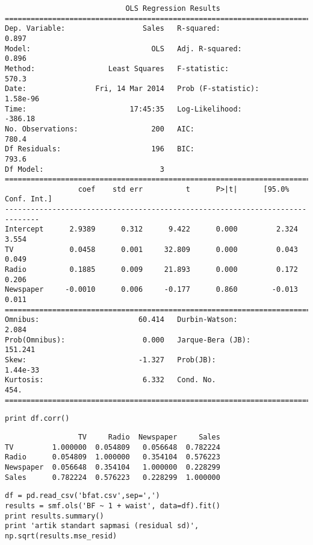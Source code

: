 \documentclass[12pt,fleqn]{article}\usepackage{../common}
\begin{document}
\begin{verbatim}
                            OLS Regression Results                            
==============================================================================
Dep. Variable:                  Sales   R-squared:                       0.897
Model:                            OLS   Adj. R-squared:                  0.896
Method:                 Least Squares   F-statistic:                     570.3
Date:                Fri, 14 Mar 2014   Prob (F-statistic):           1.58e-96
Time:                        17:45:35   Log-Likelihood:                -386.18
No. Observations:                 200   AIC:                             780.4
Df Residuals:                     196   BIC:                             793.6
Df Model:                           3                                         
==============================================================================
                 coef    std err          t      P>|t|      [95.0% Conf. Int.]
------------------------------------------------------------------------------
Intercept      2.9389      0.312      9.422      0.000         2.324     3.554
TV             0.0458      0.001     32.809      0.000         0.043     0.049
Radio          0.1885      0.009     21.893      0.000         0.172     0.206
Newspaper     -0.0010      0.006     -0.177      0.860        -0.013     0.011
==============================================================================
Omnibus:                       60.414   Durbin-Watson:                   2.084
Prob(Omnibus):                  0.000   Jarque-Bera (JB):              151.241
Skew:                          -1.327   Prob(JB):                     1.44e-33
Kurtosis:                       6.332   Cond. No.                         454.
==============================================================================
\end{verbatim}


\begin{verbatim}
print df.corr()
\end{verbatim}

\begin{verbatim}
                 TV     Radio  Newspaper     Sales
TV         1.000000  0.054809   0.056648  0.782224
Radio      0.054809  1.000000   0.354104  0.576223
Newspaper  0.056648  0.354104   1.000000  0.228299
Sales      0.782224  0.576223   0.228299  1.000000
\end{verbatim}


\begin{verbatim}
df = pd.read_csv('bfat.csv',sep=',')
results = smf.ols('BF ~ 1 + waist', data=df).fit()
print results.summary()
print 'artik standart sapmasi (residual sd)', np.sqrt(results.mse_resid)
\end{verbatim}
\end{document}
